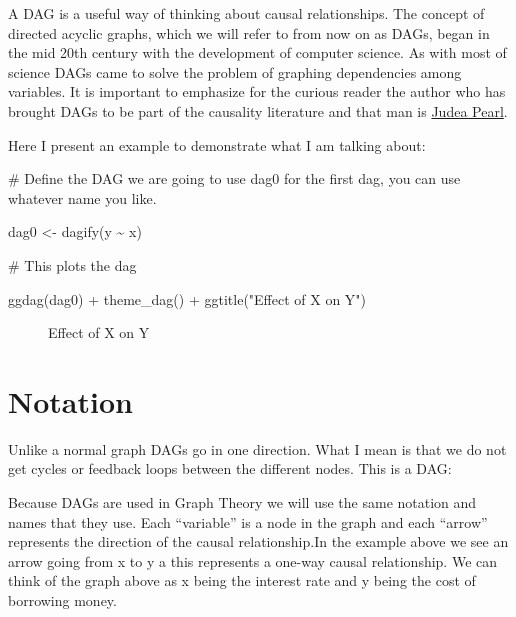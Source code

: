 \documentclass[
  letterpaper,
  DIV=11,
  numbers=noendperiod]{scrreprt}
\newenvironment{Shaded}{\begin{snugshade}}{\end{snugshade}}
\newcommand{\CommentTok}[1]{\textcolor[rgb]{0.37,0.37,0.37}{#1}}
\newcommand{\FunctionTok}[1]{\textcolor[rgb]{0.28,0.35,0.67}{#1}}
\newcommand{\NormalTok}[1]{\textcolor[rgb]{0.00,0.23,0.31}{#1}}
\newcommand{\OtherTok}[1]{\textcolor[rgb]{0.00,0.23,0.31}{#1}}
\newcommand{\SpecialCharTok}[1]{\textcolor[rgb]{0.37,0.37,0.37}{#1}}
\newcommand{\StringTok}[1]{\textcolor[rgb]{0.13,0.47,0.30}{#1}}
\theoremstyle{definition}
\theoremstyle{remark}
\begin{document}
A DAG is a useful way of thinking about causal relationships. The
concept of directed acyclic graphs, which we will refer to from now on
as DAGs, began in the mid 20th century with the development of computer
science. As with most of science DAGs came to solve the problem of
graphing dependencies among variables. It is important to emphasize for
the curious reader the author who has brought DAGs to be part of the
causality literature and that man is
\href{https://en.wikipedia.org/wiki/Judea_Pearl}{Judea Pearl}.

Here I present an example to demonstrate what I am talking about:

\begin{Shaded}
\begin{Highlighting}[]
\CommentTok{\# Define the DAG we are going to use dag0 for the first dag, you can use whatever name you like. }

\NormalTok{dag0 }\OtherTok{\textless{}{-}} \FunctionTok{dagify}\NormalTok{(y }\SpecialCharTok{\textasciitilde{}}\NormalTok{ x)}

\CommentTok{\# This plots the dag}

\FunctionTok{ggdag}\NormalTok{(dag0) }\SpecialCharTok{+} 
  \FunctionTok{theme\_dag}\NormalTok{() }\SpecialCharTok{+}
  \FunctionTok{ggtitle}\NormalTok{(}\StringTok{"Effect of X on Y"}\NormalTok{)}
\end{Highlighting}
\end{Shaded}

\begin{figure}[H]


\caption{\label{fig-dag}Effect of X on Y}

\end{figure}%

\chapter{Notation}\label{notation}

Unlike a normal graph DAGs go in one direction. What I mean is that we
do not get cycles or feedback loops between the different nodes. This is
a DAG:

Because DAGs are used in Graph Theory we will use the same notation and
names that they use. Each ``variable'' is a node in the graph and each
``arrow'' represents the direction of the causal relationship.In the
example above we see an arrow going from x to y a this represents a
one-way causal relationship. We can think of the graph above as x being
the interest rate and y being the cost of borrowing money.
\end{document}
